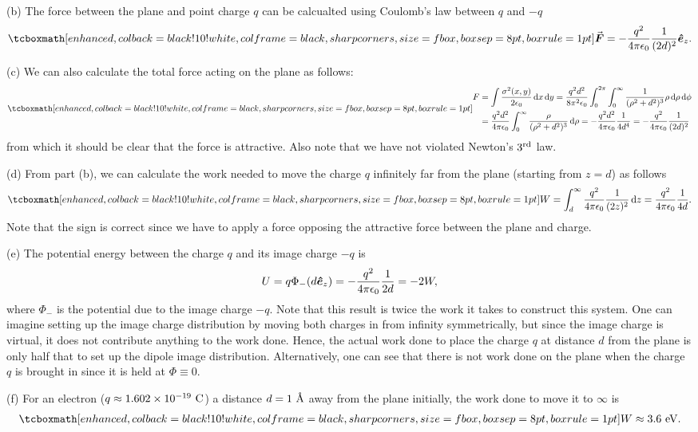 {(b) The force between the plane and point charge $q$ can be calcualted using Coulomb's law between $q$ and $-q$
\begin{eqnarray}
    \eqbox{ \va*{F} = - \frac{q^2}{4 \pi \epsilon_0} \frac{1}{(2d)^2} \vu*{e}_{z} }
.\end{eqnarray}

(c) We can also calculate the total force acting on the plane as follows:
\begin{eqnarray}
    \eqbox{
   \begin{aligned}
       F &= \int \frac{\sigma^2(x,y)}{2 \epsilon_0} \dd{x} \dd{y} = \frac{q^2 d^2}{8 \pi^2 \epsilon_0} \int_{0}^{2 \pi} \int_{0}^{\infty} \frac{1}{(\rho^2 + d^2)^3} \rho \dd{\rho} \dd{\phi} \\
         &= \frac{q^2 d^2}{4 \pi \epsilon_0} \int_{0}^{\infty} \frac{\rho}{(\rho^2 + d^2)^3} \dd{\rho} = -\frac{q^2 d^2}{4 \pi \epsilon_0} \frac{1}{4 d^{4}} = -\frac{q^2}{4 \pi \epsilon_0} \frac{1}{(2d)^2}
   \end{aligned} 
}
\end{eqnarray}
from which it should be clear that the force is attractive.
Also note that we have not violated Newton's $3^{\rm rd}$ law.

(d) From part (b), we can calculate the work needed to move the charge $q$ infinitely far from the plane (starting from $z = d$) as follows
\begin{eqnarray}
    \eqbox{ W = \int_{d}^{\infty} \frac{q^2}{4 \pi \epsilon_0} \frac{1}{(2 z)^2} \dd{z} = \frac{q^2}{4 \pi \epsilon_0} \frac{1}{4 d} }
.\end{eqnarray}
Note that the sign is correct since we have to apply a force opposing the attractive force between the plane and charge.

(e) The potential energy between the charge $q$ and its image charge $-q$ is 
\begin{eqnarray}
    U = q \Phi_{-}(d \vu*{e}_{z}) = - \frac{q^2}{4 \pi \epsilon_0} \frac{1}{2 d} = -2 W
,\end{eqnarray}
where $\Phi_{-}$ is the potential due to the image charge $-q$.
Note that this result is twice the work it takes to construct this system.
One can imagine setting up the image charge distribution by moving both charges in from infinity symmetrically, but since the image charge is virtual, it does not contribute anything to the work done.
Hence, the actual work done to place the charge $q$ at distance $d$ from the plane is only half that to set up the dipole image distribution.
Alternatively, one can see that there is not work done on the plane when the charge $q$ is brought in since it is held at $\Phi \equiv 0$.

(f) For an electron ($q \approx 1.602 \times 10^{-19}~{\rm C}$) a distance $d = 1~{\textrm{\r{A}}}$ away from the plane initially, the work done to move it to $\infty$ is
\begin{eqnarray}
    \eqbox{ W \approx 3.6~{\rm eV} }
.\end{eqnarray}


}


